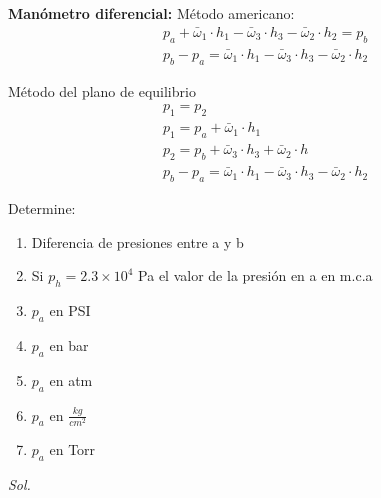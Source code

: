 \textbf{Manómetro diferencial:}
Método americano:
\begin{align}
    &p_a+\bar{\omega}_1\cdot h_1-\bar{\omega}_3\cdot h_3-\bar{\omega}_2\cdot h_2=p_b\\
    &p_b-p_a=\bar{\omega}_1\cdot h_1-\bar{\omega}_3\cdot h_3-\bar{\omega}_2\cdot h_2
\end{align}

Método del plano de equilibrio
\begin{align*}
    &p_1=p_2\\
    &p_1=p_a+\bar{\omega}_1\cdot h_1\\
    &p_2=p_b+\bar{\omega}_3\cdot h_3+\bar{\omega}_2\cdot h\\
    &p_b-p_a=\bar{\omega}_1\cdot h_1-\bar{\omega}_3\cdot h_3-\bar{\omega}_2\cdot h_2
\end{align*}


\begin{example}
    Determine:
\begin{enumerate}
    \item Diferencia de presiones entre a y b
    \item Si $p_h=2.3\times 10^4$ Pa el valor de la presión en a en m.c.a
    \item $p_a$ en PSI
    \item $p_a$ en bar
    \item $p_a$ en atm
    \item $p_a$ en $\frac{kg}{cm^2}$
    \item $p_a$ en Torr
\end{enumerate}

\end{example}

\textit{ Sol. }

